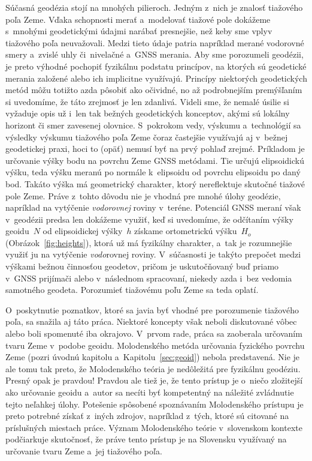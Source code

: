 \documentclass[a4paper,12pt]{book}
\begin{document}
Súčasná geodézia stojí na mnohých pilieroch.  Jedným z~nich je znalosť 
tiažového poľa Zeme.  Vďaka schopnosti merať a~modelovať tiažové pole dokážeme 
s~mnohými geodetickými údajmi narábať presnejšie, než keby sme vplyv tiažového 
poľa neuvažovali.  Medzi tieto údaje patria napríklad merané vodorovné smery 
a~zvislé uhly či~nivelačné a~GNSS merania.  Aby sme porozumeli geodézii, je 
preto výhodné pochopiť fyzikálnu podstatu princípov, na ktorých sú geodetické 
merania založené alebo ich implicitne využívajú.  Princípy niektorých 
geodetických metód môžu totižto azda pôsobiť ako očividné, no až podrobnejším 
premýšľaním si uvedomíme, že táto zrejmosť je len zdanlivá.  Videli sme, že 
nemalé úsilie si vyžaduje opis už i~len tak bežných geodetických konceptov, 
akými sú lokálny horizont či smer zavesenej olovnice.  S~pokrokom vedy, výskumu 
a~technológií sa výsledky výskumu tiažového poľa Zeme čoraz častejšie využívajú 
aj v~bežnej geodetickej praxi, hoci to (opäť) nemusí byť na prvý pohlaď zrejmé.  
Príkladom je určovanie výšky bodu na povrchu Zeme GNSS metódami.  Tie určujú 
elipsoidickú výšku, teda výšku meranú po normále k~elipsoidu od povrchu 
elipsoidu po daný bod.  Takáto výška má geometrický charakter, ktorý 
nereflektuje skutočné tiažové pole Zeme.  Práve z~tohto dôvodu nie je vhodná 
pre mnohé úlohy geodézie, napríklad na vytýčenie \emph{vodorovnej} roviny 
v~teréne.  Potenciál GNSS meraní však v~geodézii predsa len dokážeme využiť, 
keď si uvedomíme, že odčítaním výšky geoidu~$N$ od elipsoidickej výšky~$h$ 
získame ortometrickú výšku~$H_o$ (Obrázok~\ref{fig:heights}), ktorá už má 
fyzikálny charakter, a~tak je rozumnejšie využiť ju na vytýčenie 
\emph{vodo}rovnej roviny.  V~súčasnosti je takýto prepočet medzi výškami bežnou 
činnosťou geodetov, pričom je uskutočňovaný buď priamo v~GNSS prijímači alebo 
v~následnom spracovaní, niekedy azda i~bez vedomia samotného geodeta.  
Porozumieť tiažovému poľu Zeme sa teda oplatí.

O~poskytnutie poznatkov, ktoré sa javia byť vhodné pre porozumenie tiažového 
poľa, sa snažila aj táto práca.  Niektoré koncepty však neboli diskutované 
vôbec alebo boli spomenuté iba okrajovo.  V~prvom rade, práca sa zaoberala 
určovaním tvaru Zeme v~podobe geoidu.  Molodenského metóda určovania fyzického 
povrchu Zeme (pozri úvodnú kapitolu a~Kapitolu~\ref{sec:geoid}) nebola 
predstavená.  Nie je ale tomu tak preto, že Molodenského teória je nedôležitá 
pre fyzikálnu geodéziu.  Presný opak je pravdou!  Pravdou ale tiež je, že tento 
prístup je o~niečo zložitejší ako určovanie geoidu a~autor sa necíti byť 
kompetentný na náležité zvládnutie tejto neľahkej úlohy.  Potešenie spôsobené 
spoznávaním Molodenského prístupu je preto potrebné získať z~iných zdrojov, 
napríklad z~tých, ktoré sú citované na príslušných miestach práce.  Význam 
Molodenského teórie v~slovenskom kontexte podčiarkuje skutočnosť, že práve 
tento prístup je na Slovensku využívaný na určovanie tvaru Zeme a~jej tiažového 
poľa.
\end{document}
